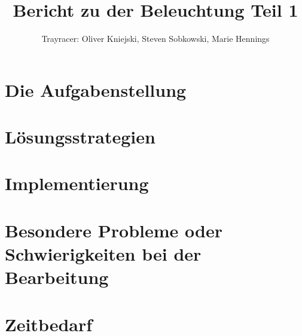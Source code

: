 \documentclass[a4paper,parskip=half,11pt]{scrartcl}
\author{Trayracer: Oliver Kniejski, Steven Sobkowski, Marie Hennings}
\title{Bericht zu der Beleuchtung Teil 1}
\begin{document}
 
\maketitle

\section*{Die Aufgabenstellung}


\section*{Lösungsstrategien}


\section*{Implementierung}


\section*{Besondere Probleme oder Schwierigkeiten bei der Bearbeitung}


\section*{Zeitbedarf}
\end{document}
